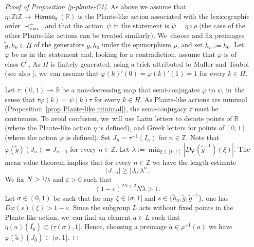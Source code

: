 \documentclass[10pt]{amsart}
\theoremstyle{definition}
\DeclareMathOperator{\homeo}{\mathsf{Homeo}}
\newcommand{\R}{\mathbb{R}}
\newcommand{\Z}{\mathbb Z}
\begin{document}
\begin{proof}[Proof of Proposition \ref{p-plante-C1}]
As above we assume that $\eta\colon \Z\wr\Z\to \homeo_0(\R)$ is the Plante-like action associated with the lexicographic order $\prec_{\max}^{+}$, and that the action~$\psi$ in the statement is $\psi=\eta\circ \rho$ (the case of the other Plante-like actions can be treated similarly). We~choose and fix preimages $\widetilde{g}, \widetilde{h}_0\in H$ of the generators $g, h_0$ under the epimorphism $\rho$, and set $\widetilde{h}_n:=\widetilde{h}_0$. Let $\varphi$ be as in the statement and, looking for a contradiction, assume that $\varphi$ is of class $C^1$. As $H$ is finitely generated, using a trick attributed to Muller \cite{Muller} and Tsuboi \cite{Tsuboi} (see also \cite{BMNR}), we~can assume that $\varphi(k)'(0)=\varphi(k)'(1)=1$ for every $k\in H$.

Let $\tau\colon(0, 1)\to \R$ be a non-decreasing map that semi-conjugates $\varphi$ to $\psi$, in~the sense that $\tau\varphi(k)=\psi(k)\tau$ for every $k\in H$. As Plante-like actions are minimal (Proposition~\ref{prop Plante-like minimal}), the semi-conjugacy $\tau$ must be continuous. To avoid confusion, we~will use Latin letters to denote points of $\R$ (where the Plante-like action $\eta$ is defined), and Greek letters for points of $[0, 1]$ (where the action $\varphi$ is defined). Set $J_n=\tau^{-1}(I_n)$ for $n\in \Z$. Note that $\varphi(\tilde{g})(J_n)=J_{n+1}$ for every $n\in \Z$. Let $\lambda:=\min_{\xi\in[0,1]}|D\varphi(\widetilde{g}^{-1})(\xi)|$. The mean value theorem implies that for every $n\in \Z$ we have the length estimate
\begin{equation} |J_{-n}|\geq |J_0|\lambda^{n}. \label{e-Jn}\end{equation}
We fix $N>\sfrac{1}{\lambda}$ and $\varepsilon>0$ such that
\begin{equation} (1-\varepsilon)^{2N+2}N\lambda>1. \label{e-epsilon-choice}
\end{equation}
Let $\sigma\in (0,1)$ be such that for any $\xi\in (\sigma, 1]$ and $s\in \{\widetilde{h}_0, \widetilde{g}, \widetilde{g}^{-1} \}$, one has $ D\varphi(s)(\xi)>1-\varepsilon$. Since the subgroup $L$ acts without fixed points in the Plante-like action, we~can find an element $a\in L$ such that $\eta(a)(\overline{I_0})\subset (\tau(\sigma), 1]$. Hence, choosing a preimage $\widetilde{a}\in \rho^{-1}(a)$ we have $\varphi(\widetilde{a})(\overline{J_0})\subset (\sigma, 1]$.


\end{proof}
\end{document}
